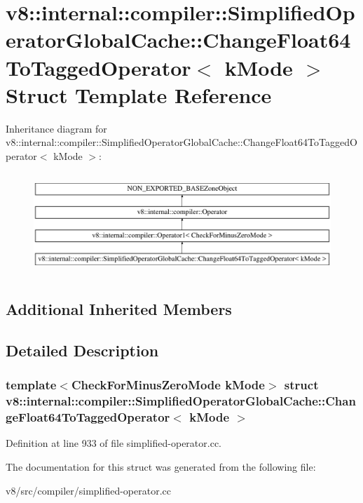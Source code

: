 \hypertarget{structv8_1_1internal_1_1compiler_1_1SimplifiedOperatorGlobalCache_1_1ChangeFloat64ToTaggedOperator}{}\section{v8\+:\+:internal\+:\+:compiler\+:\+:Simplified\+Operator\+Global\+Cache\+:\+:Change\+Float64\+To\+Tagged\+Operator$<$ k\+Mode $>$ Struct Template Reference}
\label{structv8_1_1internal_1_1compiler_1_1SimplifiedOperatorGlobalCache_1_1ChangeFloat64ToTaggedOperator}
Inheritance diagram for v8\+:\+:internal\+:\+:compiler\+:\+:Simplified\+Operator\+Global\+Cache\+:\+:Change\+Float64\+To\+Tagged\+Operator$<$ k\+Mode $>$\+:\begin{figure}[H]
\begin{center}
\leavevmode
\includegraphics[height=3.855422cm]{structv8_1_1internal_1_1compiler_1_1SimplifiedOperatorGlobalCache_1_1ChangeFloat64ToTaggedOperator}
\end{center}
\end{figure}
\subsection*{Additional Inherited Members}


\subsection{Detailed Description}
\subsubsection*{template$<$Check\+For\+Minus\+Zero\+Mode k\+Mode$>$\newline
struct v8\+::internal\+::compiler\+::\+Simplified\+Operator\+Global\+Cache\+::\+Change\+Float64\+To\+Tagged\+Operator$<$ k\+Mode $>$}



Definition at line 933 of file simplified-\/operator.\+cc.



The documentation for this struct was generated from the following file\+:\begin{DoxyCompactItemize}
\item 
v8/src/compiler/simplified-\/operator.\+cc\end{DoxyCompactItemize}
